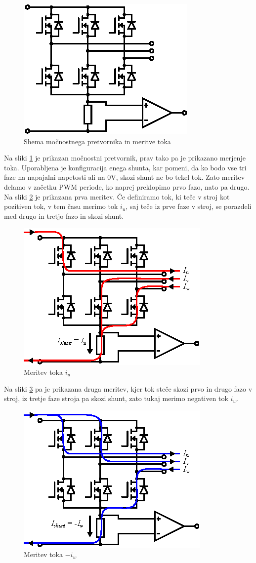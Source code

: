 \documentclass[a4paper,twoside,openright,12pt,slovene]{book}
\begin{document}
\begin{figure}[!htbp]
    \centering
    \includegraphics[width=0.5\columnwidth]{Slike/Inkscape/inverter.eps}
    \caption{\label{inverter} Shema močnostnega pretvornika in meritve toka }
\end{figure}

Na sliki \ref{inverter} je prikazan močnostni pretvornik, prav tako pa je prikazano merjenje toka. Uporabljena je konfiguracija enega shunta, kar pomeni, da ko bodo vse tri faze na napajalni
napetosti ali na 0V, skozi shunt ne bo tekel tok. Zato meritev delamo v začetku PWM periode, ko naprej preklopimo prvo fazo, nato pa drugo. Na sliki \ref{meritevTokaIu} je prikazana prva meritev.
Če definiramo tok, ki teče v stroj kot pozitiven tok, v tem času merimo tok $i_u$, saj teče iz prve faze v stroj, se porazdeli med drugo in tretjo fazo in skozi shunt. 

\begin{figure}[!htbp]
    \centering
    \includegraphics[width=0.5\columnwidth]{Slike/Inkscape/meritevTokaIu.eps}
    \caption{\label{meritevTokaIu} Meritev toka $i_u$ }
\end{figure}

Na sliki \ref{meritevTokaIw} pa je prikazana druga meritev, kjer tok steče skozi prvo in drugo fazo v stroj, iz tretje faze stroja pa skozi shunt, zato tukaj merimo negativen tok $i_w$. 

\begin{figure}[!htbp]
    \centering
    \includegraphics[width=0.5\columnwidth]{Slike/Inkscape/meritevTokaIw.eps}
    \caption{\label{meritevTokaIw} Meritev toka $-i_w$ }
\end{figure}
\end{document}
